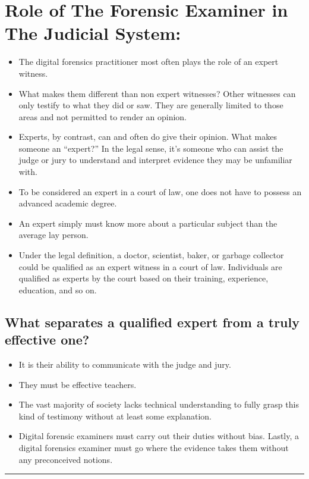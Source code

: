 \documentclass[british]{article}
\begin{document}
\section{Role of The Forensic Examiner in The Judicial System:}
\begin{itemize}
\item The digital forensics practitioner most often plays the role of an
expert witness. 
\item What makes them different than non expert witnesses? Other witnesses
can only testify to what they did or saw. They are generally limited
to those areas and not permitted to render an opinion. 
\item Experts, by contrast, can and often do give their opinion. What makes
someone an ``expert?'' In the legal sense, it's someone who can
assist the judge or jury to understand and interpret evidence they
may be unfamiliar with. 
\item To be considered an expert in a court of law, one does not have to
possess an advanced academic degree. 
\item An expert simply must know more about a particular subject than the
average lay person. 
\item Under the legal definition, a doctor, scientist, baker, or garbage
collector could be qualified as an expert witness in a court of law.
Individuals are qualified as experts by the court based on their training,
experience, education, and so on. 
\end{itemize}

\subsection{What separates a qualified expert from a truly effective one? }
\begin{itemize}
\item It is their ability to communicate with the judge and jury. 
\item They must be effective teachers. 
\item The vast majority of society lacks technical understanding to fully
grasp this kind of testimony without at least some explanation. 
\item Digital forensic examiners must carry out their duties without bias.
Lastly, a digital forensics examiner must go where the evidence takes
them without any preconceived notions. 
\end{itemize}
\rule[0.5ex]{0.75\columnwidth}{1pt}
\end{document}
